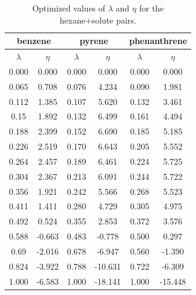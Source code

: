 \begin{table}[h]
	\centering
	\caption{Optimized values of $\lambda $ and $\eta $ for the hexane+solute pairs.}
	\label{tbl:lambdahex}
	\begin{tabular}{cccccc}
		\hline\hline
		\multicolumn{2}{c}{benzene}&\multicolumn{2}{c}{pyrene}& \multicolumn{2}{c}{phenanthrene}\\
		\hline\hline
		$\lambda$ & $\eta$& $\lambda$ & $\eta$  & $\lambda$ & $\eta$   \\ 
		\hline\hline
		0.000     &0.000      & 0.000    &    0.000    &    0.000    &    0.000    \\
		0.065     &0.708  & 0.076    &    4.234    &    0.090    &    1.981    \\
		0.112     &1.385  & 0.107    &    5.620    &    0.132    &    3.461    \\
		0.15      &1.892  & 0.132    &    6.499    &    0.161    &    4.494    \\
		0.188     &2.399  & 0.152    &    6.690    &    0.185    &    5.185    \\
		0.226     &2.519  & 0.170    &    6.643    &    0.205    &    5.552    \\
		0.264     &2.457  & 0.189    &    6.461    &    0.224    &    5.725    \\
		0.304     &2.367  & 0.213    &    6.091    &    0.244    &    5.722    \\
		0.356     &1.921  & 0.242    &    5.566    &    0.268    &    5.523    \\
		0.411     &1.411  & 0.280    &    4.729    &    0.305    &    4.975    \\
		0.492     &0.524  & 0.355    &    2.853    &    0.372    &    3.576    \\
		0.588     &-0.663 & 0.483    &    -0.778    &    0.500    &    0.297    \\
		0.69      &-2.016 & 0.678    &    -6.947    &    0.560    &    -1.390    \\
		0.824     &-3.922 & 0.788    &    -10.631    &    0.722    &    -6.309    \\
		1.000         &-6.583  &1.000      &    -18.141    &    1.000    &    -15.448    \\
		\hline\hline   
	\end{tabular}
\end{table}
